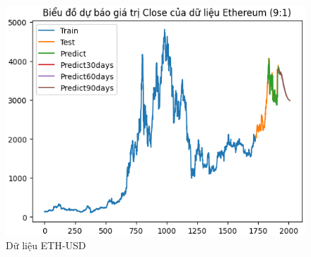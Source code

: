 \documentclass[conference]{IEEEtran}
\begin{document}
\begin{figure}[H]
\begin{minipage}{0.15\textwidth}
			\includegraphics[width=1\textwidth]{Figure/RNN_ETH91.png}
		\end{minipage}
		\caption{Dữ liệu ETH-USD}
		\label{fig:1}
	\end{figure}
\end{document}
